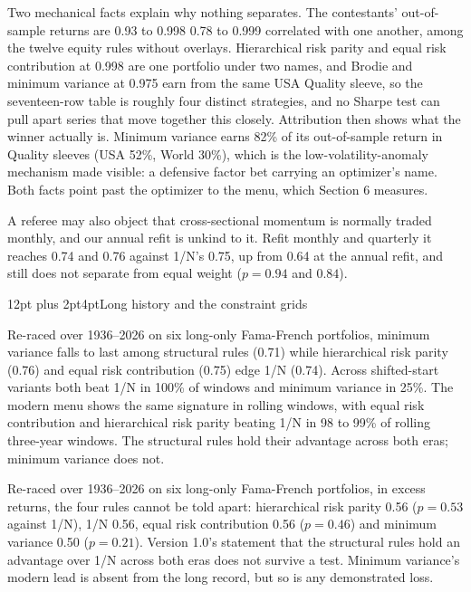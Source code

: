\documentclass[12pt,letterpaper]{article}
\makeatletter
\newcommand{\quita}[1]{{\color{quitarc}#1}}
\newcommand{\nuevo}[1]{{\color{nuevoc}#1}}
\newenvironment{quitado}{\par\color{quitarc}}{\par}
\newenvironment{nuevotexto}{\par\color{nuevoc}}{\par}
\renewcommand{\subsection}{\@startsection{subsection}{2}{\parindent}%
  {12pt plus 2pt}{4pt}{\normalfont\bfseries}}
\makeatother
\begin{document}
Two mechanical facts explain why nothing separates. The contestants' out-of-sample
returns are \quita{0.93 to 0.998} \nuevo{0.78 to 0.999} correlated with one another\nuevo{, among the twelve equity rules without
overlays}. Hierarchical risk parity
and equal risk contribution at 0.998 are one portfolio under two names, and
Brodie and minimum variance at 0.975 earn from the same USA Quality sleeve, so
the seventeen-row table is roughly four distinct strategies, and no Sharpe test
can pull apart series that move together this closely. Attribution then shows
what the winner actually is. Minimum variance earns 82\% of its out-of-sample return in Quality sleeves (USA 52\%, World 30\%), which is the
low-volatility-anomaly mechanism made visible: a defensive factor bet carrying an
optimizer's name. \quita{Both facts point past the optimizer to the menu, which
Section 6 measures.}

\nuevo{A referee may also object that cross-sectional momentum is normally traded monthly, and our
annual refit is unkind to it. Refit monthly and quarterly it reaches 0.74 and 0.76 against 1/N's 0.75,
up from 0.64 at the annual refit, and still does not separate from equal weight ($p = 0.94$ and
$0.84$).}

\subsection{Long history and the constraint grids}

\begin{quitado}
Re-raced over 1936--2026 on six long-only Fama-French portfolios, minimum variance
falls to last among structural rules (0.71) while hierarchical risk parity (0.76)
and equal risk contribution (0.75) edge 1/N (0.74). Across shifted-start variants
both beat 1/N in 100\% of windows and minimum variance in 25\%. The
modern menu shows the same signature in rolling windows, with equal risk
contribution and hierarchical risk parity beating 1/N in 98 to 99\% of rolling
three-year windows. The structural rules hold their advantage across both eras; minimum variance does not.
\end{quitado}
\begin{nuevotexto}
Re-raced over 1936--2026 on six long-only Fama-French portfolios, in excess returns, the four rules
cannot be told apart: hierarchical risk parity 0.56 ($p = 0.53$ against 1/N), 1/N 0.56, equal risk
contribution 0.56 ($p = 0.46$) and minimum variance 0.50 ($p = 0.21$). Version 1.0's statement that
the structural rules hold an advantage over 1/N across both eras does not survive a test. Minimum
variance's modern lead is absent from the long record, but so is any demonstrated loss.
\end{nuevotexto}
\end{document}
